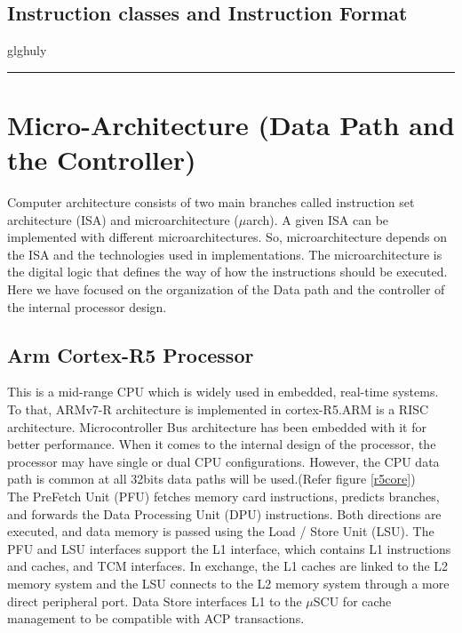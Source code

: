 \documentclass[a4paper,11pt]{article}
\begin{document}
\subsection{Instruction classes and Instruction Format}
glghuly

\vspace{1cm}\hrule

\section{Micro-Architecture (Data Path and the Controller)}
Computer architecture consists of two main branches called instruction set architecture (ISA) and microarchitecture ($\mu$arch). A given ISA can be implemented with different microarchitectures. So, microarchitecture depends on the ISA and the technologies used in implementations. The microarchitecture is the digital logic that defines the way of how the instructions should be executed. Here we have focused on the organization of the Data path and the controller of the internal processor design\cite{pcmag}.
\subsection{Arm Cortex-R5 Processor}
This is a mid-range CPU which is widely used in embedded, real-time systems. To that, ARMv7-R architecture is implemented in cortex-R5.ARM is a RISC architecture. Microcontroller Bus architecture has been embedded with it for better performance. When it comes to the internal design of the processor, the processor may have single or dual CPU configurations. However, the CPU data path is common at all 32bits data paths will be used\cite{TCLS}.(Refer figure \ref{r5core}) \\

The PreFetch Unit (PFU) fetches memory card instructions, predicts branches, and forwards the Data Processing Unit (DPU) instructions. Both directions are executed, and data memory is passed using the Load / Store Unit (LSU). The PFU and LSU interfaces support the L1 interface, which contains L1 instructions and caches, and TCM interfaces. In exchange, the L1 caches are linked to the L2 memory system and the LSU connects to the L2 memory system through a more direct peripheral port. Data Store interfaces L1 to the $\mu$SCU\cite{developer} for cache management to be compatible with ACP transactions.\\
\end{document}
